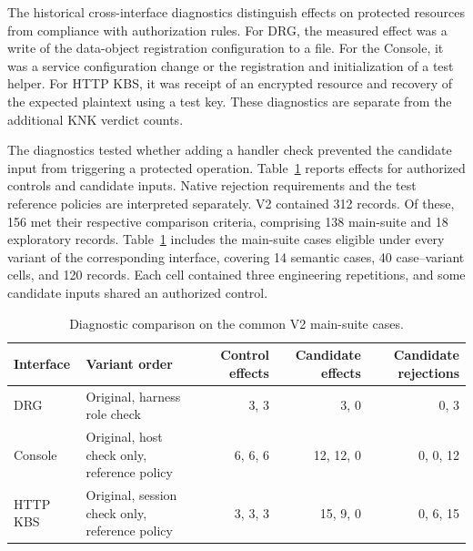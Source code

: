 The historical cross-interface diagnostics distinguish effects on protected resources from compliance with authorization rules. For DRG, the measured effect was a write of the data-object registration configuration to a file. For the Console, it was a service configuration change or the registration and initialization of a test helper. For HTTP KBS, it was receipt of an encrypted resource and recovery of the expected plaintext using a test key. These diagnostics are separate from the additional KNK verdict counts.

The diagnostics tested whether adding a handler check prevented the candidate input from triggering a protected operation. Table~\ref{tab:10} reports effects for authorized controls and candidate inputs. Native rejection requirements and the test reference policies are interpreted separately. V2 contained 312 records. Of these, 156 met their respective comparison criteria, comprising 138 main-suite and 18 exploratory records. Table~\ref{tab:10} includes the main-suite cases eligible under every variant of the corresponding interface, covering 14 semantic cases, 40 case--variant cells, and 120 records. Each cell contained three engineering repetitions, and some candidate inputs shared an authorized control.

\begin{table}[tbp]

\centering\small

\caption{Diagnostic comparison on the common V2 main-suite cases.}\label{tab:10}

\begin{tabularx}{\textwidth}{@{}lXrrr@{}}

\toprule

\textbf{Interface} & \textbf{Variant order} & \textbf{Control effects} & \textbf{Candidate effects} & \textbf{Candidate rejections} \\

\midrule

DRG & Original, harness role check & 3, 3 & 3, 0 & 0, 3 \\

Console & Original, host check only, reference policy & 6, 6, 6 & 12, 12, 0 & 0, 0, 12 \\

HTTP KBS & Original, session check only, reference policy & 3, 3, 3 & 15, 9, 0 & 0, 6, 15 \\

\bottomrule

\end{tabularx}

\end{table}

